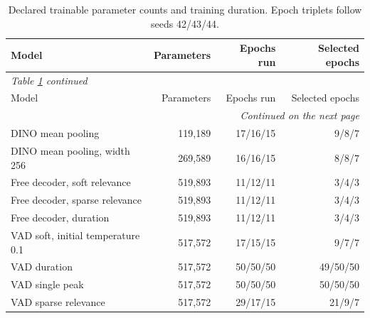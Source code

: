\begingroup
\small
\setlength{\tabcolsep}{4pt}
\begin{longtable}{p{7cm}rrr}
\caption{Declared trainable parameter counts and training duration. Epoch triplets follow seeds 42/43/44.}\label{tab:training}\\
\toprule
Model & Parameters & Epochs run & Selected epochs \\
\midrule\endfirsthead
\multicolumn{4}{l}{\textit{Table \ref{tab:training} continued}}\\
\toprule
Model & Parameters & Epochs run & Selected epochs \\
\midrule\endhead
\midrule\multicolumn{4}{r}{\textit{Continued on the next page}}\\\endfoot
\bottomrule\endlastfoot
DINO mean pooling & 119,189 & 17/16/15 & 9/8/7 \\
DINO mean pooling, width 256 & 269,589 & 16/16/15 & 8/8/7 \\
Free decoder, soft relevance & 519,893 & 11/12/11 & 3/4/3 \\
Free decoder, sparse relevance & 519,893 & 11/12/11 & 3/4/3 \\
Free decoder, duration & 519,893 & 11/12/11 & 3/4/3 \\
VAD soft, initial temperature 0.1 & 517,572 & 17/15/15 & 9/7/7 \\
VAD duration & 517,572 & 50/50/50 & 49/50/50 \\
VAD single peak & 517,572 & 50/50/50 & 50/50/50 \\
VAD sparse relevance & 517,572 & 29/17/15 & 21/9/7 \\
\end{longtable}
\endgroup
